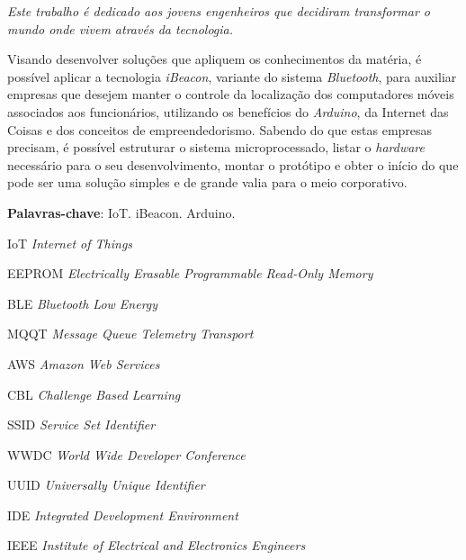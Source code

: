 \documentclass[
	12pt,				%
	openright,			%
	twoside,			%
	a4paper,			%
	english,			%
	french,				%
	spanish,			%
	brazil				%
	]{abntex2}
\begin{document}

\begin{dedicatoria}
   \vspace*{\fill}
   \centering
   \noindent
   \textit{ Este trabalho é dedicado aos jovens engenheiros que decidiram transformar o mundo onde vivem através da tecnologia.} \vspace*{\fill}
\end{dedicatoria}


\setlength{\absparsep}{18pt} %
\begin{resumo}
Visando desenvolver soluções que apliquem os conhecimentos da matéria, é possível aplicar a tecnologia \emph{iBeacon}, variante do sistema \emph{Bluetooth}, para auxiliar empresas que desejem manter o controle da localização dos computadores móveis associados aos funcionários, utilizando os benefícios do \emph{Arduino}, da Internet das Coisas e dos conceitos de empreendedorismo. Sabendo do que estas empresas precisam, é possível estruturar o sistema microprocessado, listar o \emph{hardware} necessário para o seu desenvolvimento, montar o protótipo e obter o início do que pode ser uma solução simples e de grande valia para o meio corporativo.

 \textbf{Palavras-chave}: IoT. iBeacon. Arduino.
\end{resumo}

\listoffigures*
\newpage

\listoftables*
\newpage

\begin{siglas}
  \item[IoT] \emph{Internet of Things}
  \item[EEPROM] \emph{Electrically Erasable Programmable Read-Only Memory}
  \item[BLE] \emph{Bluetooth Low Energy}
  \item[MQQT] \emph{Message Queue Telemetry Transport}
  \item[AWS] \emph{Amazon Web Services}
  \item[CBL] \emph{Challenge Based Learning}
  \item[SSID] \emph{Service Set Identifier}
  \item[WWDC] \emph{World Wide Developer Conference}
  \item[UUID] \emph{Universally Unique Identifier}
  \item[IDE] \emph{Integrated Development Environment}
  \item[IEEE] \emph{Institute of Electrical and Electronics Engineers}
\end{siglas}
\end{document}
